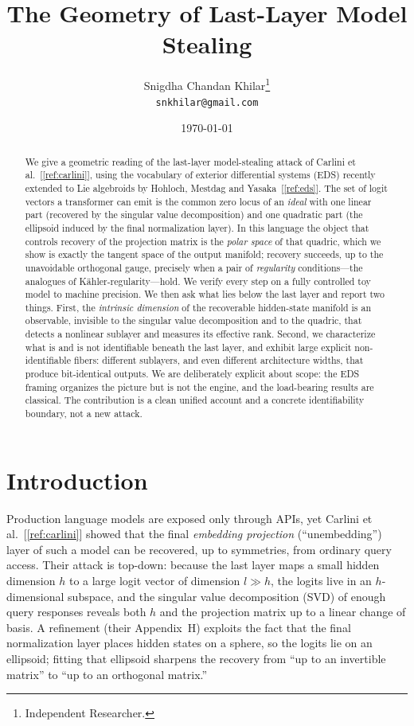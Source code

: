 \documentclass[11pt]{article}
\title{\textbf{The Geometry of Last-Layer Model Stealing}}
\author{%
  Snigdha Chandan Khilar\thanks{Independent Researcher.}\\
  \texttt{snkhilar@gmail.com}
}
\date{\today}
\begin{document}
\maketitle

\begin{abstract}
We give a geometric reading of the last-layer model-stealing attack of
Carlini et al.~[\ref{ref:carlini}], using the vocabulary of exterior differential
systems (EDS) recently extended to Lie algebroids by Hohloch, Mestdag and
Yasaka~[\ref{ref:eds}]. The set of logit vectors a transformer can emit is the
common zero locus of an \emph{ideal} with one linear part (recovered by the
singular value decomposition) and one quadratic part (the ellipsoid induced by
the final normalization layer). In this language the object that controls
recovery of the projection matrix is the \emph{polar space} of that quadric,
which we show is exactly the tangent space of the output manifold; recovery
succeeds, up to the unavoidable orthogonal gauge, precisely when a pair of
\emph{regularity} conditions---the analogues of K\"ahler-regularity---hold. We
verify every step on a fully controlled toy model to machine precision. We then
ask what lies below the last layer and report two things. First, the
\emph{intrinsic dimension} of the recoverable hidden-state manifold is an
observable, invisible to the singular value decomposition and to the quadric,
that detects a nonlinear sublayer and measures its effective rank. Second, we
characterize what is and is not identifiable beneath the last layer, and exhibit
large explicit non-identifiable fibers: different sublayers, and even different
architecture widths, that produce bit-identical outputs. We are deliberately
explicit about scope: the EDS framing organizes the picture but is not the
engine, and the load-bearing results are classical. The contribution is a clean
unified account and a concrete identifiability boundary, not a new attack.
\end{abstract}

\section{Introduction}

Production language models are exposed only through APIs, yet
Carlini et al.~[\ref{ref:carlini}] showed that the final
\emph{embedding projection} (``unembedding'') layer of such a model can be
recovered, up to symmetries, from ordinary query access. Their attack is
top-down: because the last layer maps a small hidden dimension $h$ to a large
logit vector of dimension $l\gg h$, the logits live in an $h$-dimensional
subspace, and the singular value decomposition (SVD) of enough query responses
reveals both $h$ and the projection matrix up to a linear change of basis. A
refinement (their Appendix~H) exploits the fact that the final normalization
layer places hidden states on a sphere, so the logits lie on an ellipsoid;
fitting that ellipsoid sharpens the recovery from ``up to an invertible matrix''
to ``up to an orthogonal matrix.''
\end{document}
